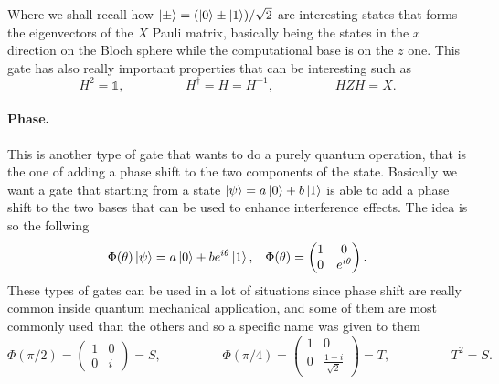 \noindent
Where we shall recall how $\ket{\pm} = (\ket{0} \pm \ket{1})/\sqrt{2}$ are interesting states that forms the eigenvectors of the $X$ Pauli matrix, basically being the states in the $x$ direction on the Bloch sphere while the computational base is on the $z$ one. This gate has also really important properties that can be interesting such as
\begin{equation}
    H^2 = \mathbb{1}, \hspace{2cm} H^\dagger = H = H^{-1}, \hspace{2cm} HZH = X.
\end{equation}

\paragraph{Phase.} This is another type of gate that wants to do a purely quantum operation, that is the one of adding a phase shift to the two components of the state. Basically we want a gate that starting from a state $\ket{\psi} = a\ket{0} + b\ket{1}$ is able to add a phase shift to the two bases that can be used to enhance interference effects. The idea is so the follwing
\begin{align}
    &\Phi(\theta)\ket{\psi} = a\ket{0} + be^{i\theta}\ket{1}, & \Phi(\theta) = \begin{pmatrix}
        1 & 0\\
        0 & e^{i\theta}
    \end{pmatrix}.
\end{align} 
These types of gates can be used in a lot of situations since phase shift are really common inside quantum mechanical application, and some of them are most commonly used than the others and so a specific name was given to them
\begin{equation}
    \Phi(\pi/2) = \begin{pmatrix}
        1 & 0\\
        0 & i
    \end{pmatrix} = S, \hspace{2cm}
    \Phi(\pi/4) = \begin{pmatrix}
        1 & 0\\
        0 & \frac{1+i}{\sqrt{2}}
    \end{pmatrix} = T, \hspace{2cm}
    T^2 = S.
\end{equation}

